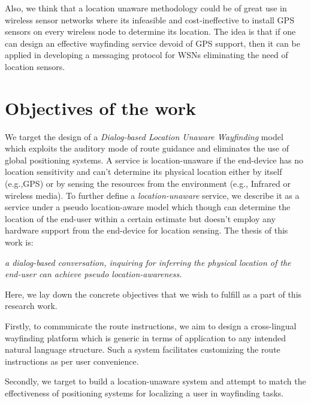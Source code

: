 \documentclass{iitkthesis}
\begin{document}
Also,  we think that a location unaware methodology could be of great use in wireless sensor networks where its infeasible and cost-ineffective to install GPS sensors on every wireless node to determine its location. The idea is that if one can design an effective wayfinding service devoid of GPS support, then it can be applied in developing a messaging protocol for WSNs eliminating the need of location sensors. 

 \section{Objectives of the work}
We target the design of a \textit{Dialog-based Location Unaware Wayfinding} model which exploits the auditory mode of route guidance and eliminates the use of global positioning systems. A service is location-unaware if the end-device has no location sensitivity and can't determine its physical location either by itself (e.g.,GPS) or by sensing the resources from the environment (e.g., Infrared or wireless media). To further define a \textit{location-unaware} service, we describe it as a service under a pseudo location-aware model which though can determine the location of the end-user within a certain estimate but doesn't employ any hardware support from the end-device for location sensing. The thesis of this work is:

{
\textit{a dialog-based conversation, inquiring for inferring the physical location of the end-user can achieve pseudo location-awareness.}
}


Here, we lay down the concrete objectives that we wish to fulfill as a part of this research work.

Firstly, to communicate the route instructions, we aim to design a cross-lingual wayfinding platform which is generic in terms of application to any intended natural language structure. Such a system facilitates customizing the route instructions as per user convenience.

Secondly, we target to build a location-unaware system and attempt to match the effectiveness of positioning systems for localizing a user in wayfinding tasks. 
\end{document}
